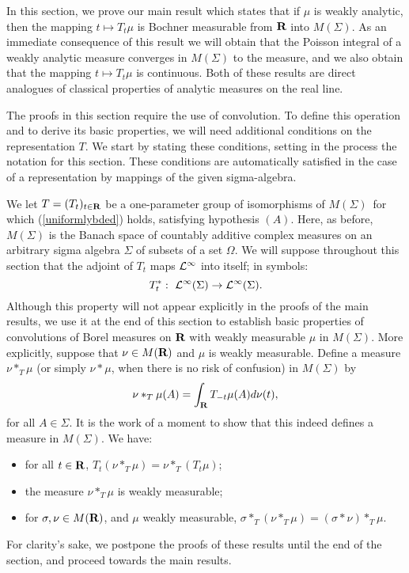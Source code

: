 In this section, we prove our main result which states that
if $\mu$ is weakly analytic, then the mapping
$t\mapsto T_t\mu$ is Bochner measurable from $\R$ into
$M(\Sigma)$.  As an immediate consequence of this result
we will obtain that the Poisson integral of a
weakly analytic measure converges in 
$M(\Sigma)$ to the measure, and we also obtain that the 
mapping $t\mapsto T_t\mu$ is continuous.
Both of these results are direct analogues of
classical properties of analytic measures on the real
line.

The proofs in this section require the use of
convolution.  To define this
operation and to derive its basic properties, we will
need additional conditions on the representation $T$.
We start by stating these conditions, setting in the 
process the notation for this section.  These conditions are automatically
satisfied in the case of a representation by mappings of the 
given sigma-algebra.  

We let $T=(T_t)_{t\in\R}$ be a one-parameter group 
of isomorphisms of $M(\Sigma)$\ for which (\ref{uniformlybded}) holds,
satisfying hypothesis $(A)$.  
Here, as before, $M(\Sigma)$ is the Banach space of countably
additive complex measures on an arbitrary sigma algebra $\Sigma$
of subsets of a set $\Omega$.  
We will suppose throughout 
this section that the adjoint of $T_t$ maps ${\cal L}^\infty$ into itself; in
symbols:  
\begin{equation}
T_t^* :\ {\cal L}^\infty (\Sigma) \rightarrow {\cal L}^\infty (\Sigma).
\label{adjointcond}
\end{equation}
Although this property will not appear explicitly in the proofs of the 
main results, we use it at the end of this 
section to establish basic properties of
convolutions of Borel measures on $\R$ with weakly measurable
$\mu$ in $M(\Sigma)$.  
More explicitly, suppose that $\nu\in M(\R)$ and $\mu$ is weakly measurable.
Define a measure $\nu*_T\mu$ (or simply
$\nu *\mu$, when there is no risk of confusion) 
in $M(\Sigma)$ by
$$\nu*_T\mu(A)=\int_\R T_{-t} \mu (A) d\nu (t),$$
for all $A\in \Sigma$.  It is the work of a moment to show that
this indeed defines a measure in $M(\Sigma)$.  We have:
\begin{itemize}
\item for all $t\in \R$, $T_t(\nu*_T\mu)=\nu*_T(T_t\mu)$;
\item the measure $\nu*_T\mu$ is weakly measurable;
\item for $\sigma,\nu\in M(\R)$, and $\mu$ weakly measurable,
$\sigma*_T(\nu*_T\mu)=(\sigma*\nu)*_T\mu$.
\end{itemize}
For clarity's sake, we postpone the proofs of these
results until the end of the section, and proceed towards
the main results.  

